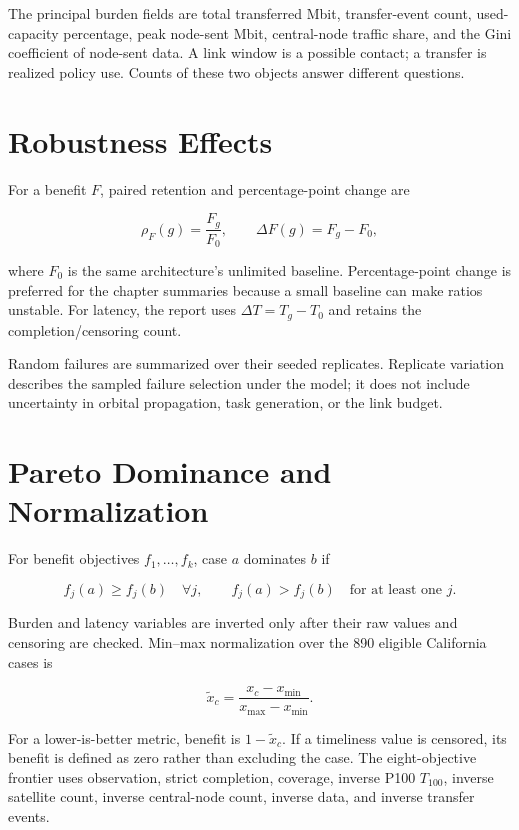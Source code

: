 The principal burden fields are total transferred Mbit, transfer-event count, used-capacity percentage, peak node-sent Mbit, central-node traffic share, and the Gini coefficient of node-sent data. A link window is a possible contact; a transfer is realized policy use. Counts of these two objects answer different questions.

\section{Robustness Effects}

For a benefit $F$, paired retention and percentage-point change are

\begin{equation}
\rho_F(g)=\frac{F_g}{F_0},\qquad \Delta F(g)=F_g-F_0,
\end{equation}

where $F_0$ is the same architecture's unlimited baseline. Percentage-point change is preferred for the chapter summaries because a small baseline can make ratios unstable. For latency, the report uses $\Delta T=T_g-T_0$ and retains the completion/censoring count.

Random failures are summarized over their seeded replicates. Replicate variation describes the sampled failure selection under the model; it does not include uncertainty in orbital propagation, task generation, or the link budget.

\section{Pareto Dominance and Normalization}

For benefit objectives $f_1,\ldots,f_k$, case $a$ dominates $b$ if

\begin{equation}
f_j(a)\ge f_j(b)\quad\forall j,\qquad
f_j(a)>f_j(b)\quad\text{for at least one }j.
\end{equation}

Burden and latency variables are inverted only after their raw values and censoring are checked. Min--max normalization over the 890 eligible California cases is

\begin{equation}
\widetilde x_c=\frac{x_c-x_{\min}}{x_{\max}-x_{\min}}.
\end{equation}

For a lower-is-better metric, benefit is $1-\widetilde x_c$. If a timeliness value is censored, its benefit is defined as zero rather than excluding the case. The eight-objective frontier uses observation, strict completion, coverage, inverse P100 $T_{100}$, inverse satellite count, inverse central-node count, inverse data, and inverse transfer events.

